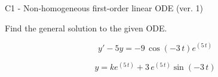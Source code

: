\begin{exercise}
  \begin{exerciseTitle}C1 - Non-homogeneous first-order linear ODE (ver. 1)\end{exerciseTitle}
  \begin{exerciseStatement}
    
Find the general solution to the given ODE.

    
\[y'-5y= -9 \, \cos\left(-3 \, t\right) e^{\left(5 \, t\right)}\]

  \end{exerciseStatement}
  \begin{exerciseAnswer}
    
\[y= k e^{\left(5 \, t\right)} + 3 \, e^{\left(5 \, t\right)} \sin\left(-3 \, t\right)\]

  \end{exerciseAnswer}
\end{exercise}